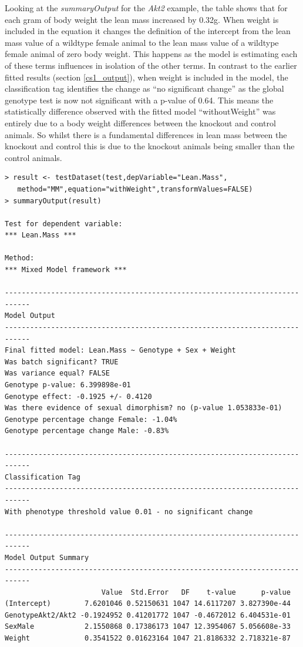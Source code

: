 \documentclass[12pt,a4paper]{article}
\begin{document}
Looking at the \textit{summaryOutput} for the \textit{Akt2} example, the table shows that for each gram of body weight the lean mass increased by 0.32g.  
When weight is included in the equation it changes the definition of the intercept from the lean mass value of a wildtype female animal to the lean mass value of a wildtype female animal of zero body weight. 
This happens as the model is estimating each of these terms influences in isolation of the other terms. 
In contrast to the earlier fitted results (section \ref{cs1_output}), when weight is included in the model, the classification tag identifies the change as “no significant change” 
as the global genotype test is now not significant with a p-value of 0.64.  
This means the statistically difference observed with the fitted model “withoutWeight” was entirely due to a body weight differences between the knockout and control animals.  
So whilst there is a fundamental differences in lean mass between the knockout and control this is due to the knockout animals being smaller than the control animals. 

\begingroup
    \fontsize{8pt}{12pt}\selectfont
\begin{verbatim}
> result <- testDataset(test,depVariable="Lean.Mass",
   method="MM",equation="withWeight",transformValues=FALSE)
> summaryOutput(result)

Test for dependent variable:
*** Lean.Mass ***

Method:
*** Mixed Model framework ***

----------------------------------------------------------------------------
Model Output
----------------------------------------------------------------------------
Final fitted model: Lean.Mass ~ Genotype + Sex + Weight
Was batch significant? TRUE
Was variance equal? FALSE
Genotype p-value: 6.399898e-01
Genotype effect: -0.1925 +/- 0.4120
Was there evidence of sexual dimorphism? no (p-value 1.053833e-01)
Genotype percentage change Female: -1.04%
Genotype percentage change Male: -0.83%

----------------------------------------------------------------------------
Classification Tag
----------------------------------------------------------------------------
With phenotype threshold value 0.01 - no significant change

----------------------------------------------------------------------------
Model Output Summary
----------------------------------------------------------------------------
                       Value  Std.Error   DF    t-value      p-value
(Intercept)        7.6201046 0.52150631 1047 14.6117207 3.827390e-44
GenotypeAkt2/Akt2 -0.1924952 0.41201772 1047 -0.4672012 6.404531e-01
SexMale            2.1550868 0.17386173 1047 12.3954067 5.056608e-33
Weight             0.3541522 0.01623164 1047 21.8186332 2.718321e-87
\end{verbatim}
\endgroup
\end{document}
